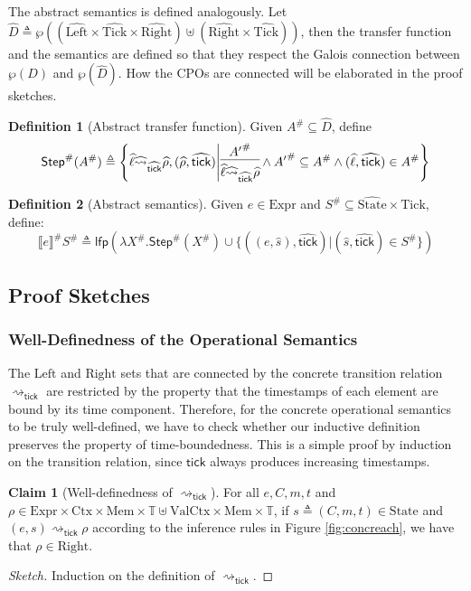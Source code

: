 \documentclass{article}
\theoremstyle{definition}
\newtheorem{definition}{Definition}[section]
\newtheorem{clm}{Claim}[section]
\newcommand*{\A}[1]{\widehat{#1}}
\newcommand*{\Abs}[1]{{#1}^{\#}}
\newcommand*{\Expr}{\text{Expr}}
\newcommand*{\Time}{\mathbb{T}}
\newcommand*{\Ctx}{\text{Ctx}}
\newcommand*{\Value}{\text{Val}}
\newcommand*{\Mem}{\text{Mem}}
\newcommand*{\Left}{\text{Left}}
\newcommand*{\Right}{\text{Right}}
\newcommand*{\mem}{m}
\newcommand*{\State}{\text{State}}
\newcommand*{\Tick}{\text{Tick}}
\newcommand*{\semarrow}{\rightsquigarrow}
\newcommand*{\sembracket}[1]{\lBrack{#1}\rBrack}
\newcommand*{\tick}{\mathsf{tick}}
\begin{document}
The abstract semantics is defined analogously.
Let $\A{D}\triangleq\wp((\A\Left\times\A\Tick\times\A\Right )\uplus(\A\Right\times\A\Tick))$, then the transfer function and the semantics are defined so that they respect the Galois connection between $\wp(D)$ and $\wp(\A{D})$.
How the CPOs are connected will be elaborated in the proof sketches.

\begin{definition}[Abstract transfer function]
  Given $\Abs{A}\subseteq\A{D}$, define
  \[
    \Abs{\mathsf{Step}}(\Abs{A})\triangleq
    \left\{\A\ell\A\semarrow_{\A\tick}\A\rho, (\A\rho,\A\tick)\middle|
    \begin{prooftree}[center=true]
      \hypo{\Abs{A'}}\infer1{\A\ell\A\semarrow_{\A\tick}\A\rho}
    \end{prooftree}\wedge
    \Abs{A'}\subseteq \Abs{A}\wedge(\A\ell,\A\tick)\in \Abs{A}
    \right\}
  \]
\end{definition}
\begin{definition}[Abstract semantics]
  Given $e\in\Expr$ and $\Abs{S}\subseteq\A\State\times\A\Tick$, define:
  \[
    \Abs{\sembracket{e}}\Abs{S}\triangleq\mathsf{lfp}(\lambda \Abs{X}.\Abs{\mathsf{Step}}(\Abs{X})\cup\{((e,\A{s}),\A\tick)|(\A{s},\A\tick)\in \Abs{S}\})
  \]
\end{definition}

\clearpage
\subsection{Proof Sketches}
\subsubsection{Well-Definedness of the Operational Semantics}

The $\Left$ and $\Right$ sets that are connected by the concrete transition relation $\semarrow_{\tick}$ are restricted by the property that the timestamps of each element are bound by its time component.
Therefore, for the concrete operational semantics to be truly well-defined, we have to check whether our inductive definition preserves the property of time-boundedness.
This is a simple proof by induction on the transition relation, since $\tick$ always produces increasing timestamps.

\begin{clm}[Well-definedness of $\semarrow_{\tick}$]
  For all $e,C,\mem,t$ and $\rho\in\Expr\times\Ctx\times\Mem\times\Time\uplus\Value\Ctx\times\Mem\times\Time$, if $s\triangleq(C,\mem,t)\in\State$ and
  $(e,s)\semarrow_{\tick}\rho$ according to the inference rules in Figure \ref{fig:concreach}, we have that $\rho\in\Right$.
\end{clm}
\begin{proof}[Sketch]
  Induction on the definition of $\semarrow_\tick$.
\end{proof}
\end{document}
